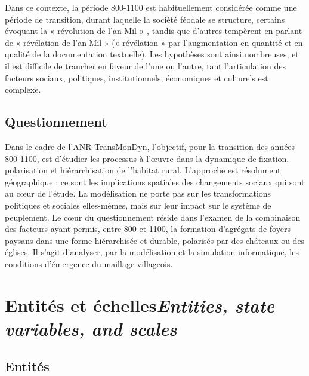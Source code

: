 {	Dans ce contexte, la période 800-1100 est habituellement considérée comme une période de transition, durant laquelle la société féodale se structure, certains évoquant la « révolution de l'an Mil » \autocite{fossier_enfance_1982}, tandis que d'autres tempèrent en parlant de « révélation de l'an Mil » \autocite{barthelemy_societe_1993} (« révélation » par l'augmentation en quantité et en qualité de la documentation textuelle).
	Les hypothèses sont ainsi nombreuses, et il est difficile de trancher en faveur de l'une ou l'autre, tant l'articulation des facteurs sociaux, politiques, institutionnels, économiques et culturels est complexe.
}

\subsection{Questionnement}

{\redroman
	Dans le cadre de l'ANR TransMonDyn, l'objectif, pour la transition des années 800-1100, est d'étudier les processus à l'œuvre dans la dynamique de fixation, polarisation et hiérarchisation de l'habitat rural.
	L'approche est résolument géographique ; ce sont les implications spatiales des changements sociaux qui sont au cœur de l'étude.
	La modélisation ne porte pas sur les transformations politiques et sociales elles-mêmes, mais sur leur impact sur le système de peuplement.
	Le cœur du questionnement réside dans l'examen de la combinaison des facteurs ayant permis, entre 800 et 1100, la formation d'agrégats de foyers paysans dans une forme hiérarchisée et durable, polarisés par des châteaux ou des églises.
	Il s'agit d'analyser, par la modélisation et la simulation informatique, les conditions d'émergence du maillage villageois.
}


\section[Entités et échelles -- \textit{Entities, state variables, and scales}]{Entités et échelles\protect\newline \large{\textit{Entities, state variables, and scales}} }

\subsection{Entités}

